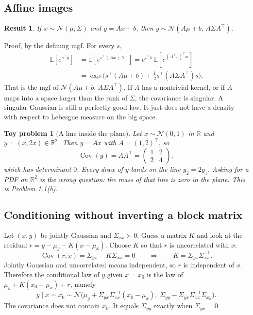 \documentclass[11pt]{article}
\newtheorem{result}{Result}
\newtheorem{toy}{Toy problem}
\theoremstyle{remark}
\newcommand{\E}{\mathbb{E}}
\newcommand{\R}{\mathbb{R}}
\newcommand{\Cov}{\operatorname{Cov}}
\newcommand{\N}{\mathcal{N}}
\begin{document}
\subsection{Affine images}

\begin{result}
If \(x\sim\N(\mu,\Sigma)\) and \(y=Ax+b\), then \(y\sim\N(A\mu+b,\,A\Sigma A^\top)\).
\end{result}

Proof, by the defining mgf. For every \(s\),
\begin{align*}
\E[e^{s^\top y}]
&=\E[e^{s^\top(Ax+b)}]
=e^{s^\top b}\,\E[e^{(A^\top s)^\top x}]\\
&=\exp\big(s^\top(A\mu+b)+\tfrac12 s^\top(A\Sigma A^\top)s\big).
\end{align*}
That is the mgf of \(\N(A\mu+b,\,A\Sigma A^\top)\). If \(A\) has a nontrivial kernel, or if \(A\) maps into a space larger than the rank of \(\Sigma\), the covariance is singular. A singular Gaussian is still a perfectly good law. It just does not have a density with respect to Lebesgue measure on the big space.

\begin{toy}[A line inside the plane]
Let \(x\sim\N(0,1)\) in \(\R\) and \(y=(x,2x)\in\R^2\). Then \(y=Ax\) with \(A=(1,2)^\top\), so
\[
\Cov(y)=AA^\top=\begin{pmatrix}1&2\\2&4\end{pmatrix},
\]
which has determinant \(0\). Every draw of \(y\) lands on the line \(y_2=2y_1\). Asking for a PDF on \(\R^2\) is the wrong question: the mass of that line is zero in the plane. This is Problem 1.1(b).
\end{toy}

\subsection{Conditioning without inverting a block matrix}

Let \((x,y)\) be jointly Gaussian and \(\Sigma_{xx}\succ 0\). Guess a matrix \(K\) and look at the residual \(r=y-\mu_y-K(x-\mu_x)\). Choose \(K\) so that \(r\) is uncorrelated with \(x\):
\[
\Cov(r,x)=\Sigma_{yx}-K\Sigma_{xx}=0
\qquad\Rightarrow\qquad
K=\Sigma_{yx}\Sigma_{xx}^{-1}.
\]
Jointly Gaussian and uncorrelated means independent, so \(r\) is independent of \(x\). Therefore the conditional law of \(y\) given \(x=x_0\) is the law of \(\mu_y+K(x_0-\mu_x)+r\), namely
\[
y\mid x=x_0\sim\N\big(\mu_y+\Sigma_{yx}\Sigma_{xx}^{-1}(x_0-\mu_x),\;
\Sigma_{yy}-\Sigma_{yx}\Sigma_{xx}^{-1}\Sigma_{xy}\big).
\]
The covariance does not contain \(x_0\). It equals \(\Sigma_{yy}\) exactly when \(\Sigma_{yx}=0\).
\end{document}

